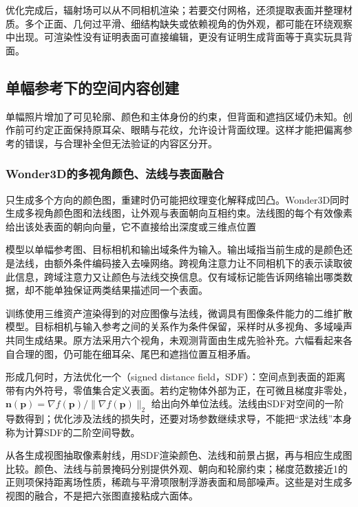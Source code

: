 优化完成后，辐射场可以从不同相机渲染；若要交付网格，还须提取表面并整理材质。多个正面、几何过平滑、细结构缺失或依赖视角的伪外观，都可能在环绕观察中出现。可渲染性没有证明表面可直接编辑，更没有证明生成背面等于真实玩具背面。

\subsection{单幅参考下的空间内容创建}
\label{sec:vision-multigen-single-reference}

单幅照片增加了可见轮廓、颜色和主体身份的约束，但背面和遮挡区域仍未知。创作前可约定正面保持原耳朵、眼睛与花纹，允许设计背面纹理。这样才能把偏离参考的错误，与合理补全但无法验证的内容区分开。

\subsubsection{Wonder3D的多视角颜色、法线与表面融合}
\label{sec:vision-multigen-wonder3d}

只生成多个方向的颜色图，重建时仍可能把纹理变化解释成凹凸。Wonder3D同时生成多视角颜色图和法线图，让外观与表面朝向互相约束。法线图的每个有效像素给出该处表面的朝向向量，它不直接给出深度或三维点位置

模型以单幅参考图、目标相机和输出域条件为输入。输出域指当前生成的是颜色还是法线，由额外条件编码接入去噪网络。跨视角注意力让不同相机下的表示读取彼此信息，跨域注意力又让颜色与法线交换信息。仅有域标记能告诉网络输出哪类数据，却不能单独保证两类结果描述同一个表面。

训练使用三维资产渲染得到的对应图像与法线，微调具有图像条件能力的二维扩散模型。目标相机与输入参考之间的关系作为条件保留，采样时从多视角、多域噪声共同生成结果。原方法采用六个视角，未观测背面由生成先验补充。六幅看起来各自合理的图，仍可能在细耳朵、尾巴和遮挡位置互相矛盾。

形成几何时，方法优化一个（signed distance field，SDF）：空间点到表面的距离带有内外符号，零值集合定义表面。若约定物体外部为正，在可微且梯度非零处，
$\bm n(\bm p)=\nabla f(\bm p)/\|\nabla f(\bm p)\|_2$
给出向外单位法线。法线由SDF对空间的一阶导数得到；优化涉及法线的损失时，还要对场参数继续求导，不能把“求法线”本身称为计算SDF的二阶空间导数。

从各生成视图抽取像素射线，用SDF渲染颜色、法线和前景占据，再与相应生成图比较。颜色、法线与前景掩码分别提供外观、朝向和轮廓约束；梯度范数接近1的正则项保持距离场性质，稀疏与平滑项限制浮游表面和局部噪声。这些是对生成多视图的融合，不是把六张图直接粘成六面体。

